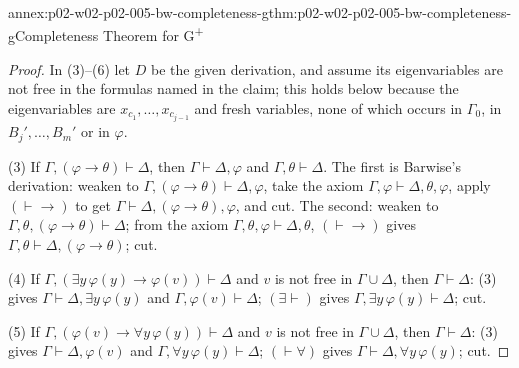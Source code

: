 \begin{annexitem}{annex:p02-w02-p02-005-bw-completeness-g}{thm:p02-w02-p02-005-bw-completeness-g}{Completeness Theorem for G\textsuperscript{+}}
\begin{proof}
In (3)--(6) let \(D\) be the given derivation, and assume its eigenvariables
are not free in the formulas named in the claim; this holds below because
the eigenvariables are \(x_{c_1},\ldots,x_{c_{j-1}}\) and fresh variables,
none of which occurs in \(\Gamma_0\), in \(B_j',\ldots,B_m'\) or in
\(\varphi\).

(3) If \(\Gamma,(\varphi\to\theta)\vdash\Delta\), then
\(\Gamma\vdash\Delta,\varphi\) and \(\Gamma,\theta\vdash\Delta\).  The first
is Barwise's derivation: weaken to
\(\Gamma,(\varphi\to\theta)\vdash\Delta,\varphi\), take the axiom
\(\Gamma,\varphi\vdash\Delta,\theta,\varphi\), apply \((\vdash\to)\) to get
\(\Gamma\vdash\Delta,(\varphi\to\theta),\varphi\), and cut.  The second:
weaken to \(\Gamma,\theta,(\varphi\to\theta)\vdash\Delta\); from the axiom
\(\Gamma,\theta,\varphi\vdash\Delta,\theta\), \((\vdash\to)\) gives
\(\Gamma,\theta\vdash\Delta,(\varphi\to\theta)\); cut.

(4) If \(\Gamma,(\exists y\,\varphi(y)\to\varphi(v))\vdash\Delta\) and \(v\)
is not free in \(\Gamma\cup\Delta\), then \(\Gamma\vdash\Delta\): (3) gives
\(\Gamma\vdash\Delta,\exists y\,\varphi(y)\) and
\(\Gamma,\varphi(v)\vdash\Delta\); \((\exists\vdash)\) gives
\(\Gamma,\exists y\,\varphi(y)\vdash\Delta\); cut.

(5) If \(\Gamma,(\varphi(v)\to\forall y\,\varphi(y))\vdash\Delta\) and \(v\)
is not free in \(\Gamma\cup\Delta\), then \(\Gamma\vdash\Delta\): (3) gives
\(\Gamma\vdash\Delta,\varphi(v)\) and \(\Gamma,\forall y\,\varphi(y)\vdash\Delta\);
\((\vdash\forall)\) gives \(\Gamma\vdash\Delta,\forall y\,\varphi(y)\); cut.


\end{proof}
\end{annexitem}
